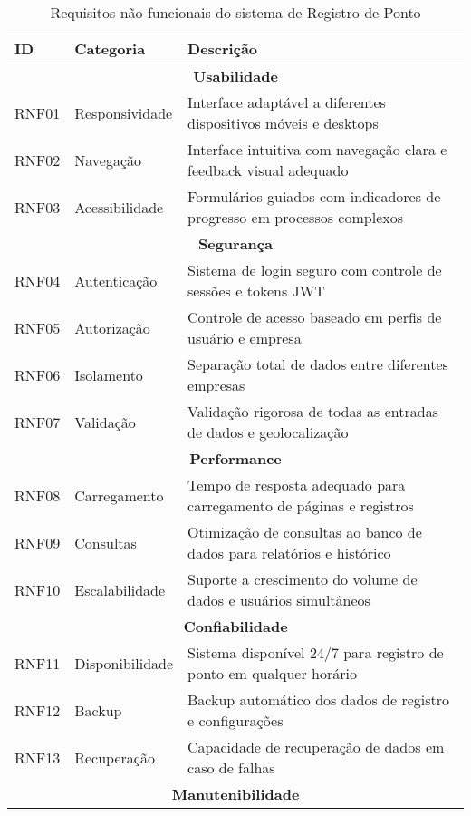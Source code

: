 \begin{table}[!htbp]
\centering
\small
\caption{Requisitos não funcionais do sistema de Registro de Ponto}
\label{tab:requisitos-nao-funcionais}
\begin{tabular}{|p{}|p{}|p{}|}
\hline
\textbf{ID} & \textbf{Categoria} & \textbf{Descrição} \\
\hline
\multicolumn{3}{|c|}{\textbf{Usabilidade}} \\
\hline
RNF01 & Responsividade & Interface adaptável a diferentes dispositivos móveis e desktops \\
\hline
RNF02 & Navegação & Interface intuitiva com navegação clara e feedback visual adequado \\
\hline
RNF03 & Acessibilidade & Formulários guiados com indicadores de progresso em processos complexos \\
\hline
\multicolumn{3}{|c|}{\textbf{Segurança}} \\
\hline
RNF04 & Autenticação & Sistema de login seguro com controle de sessões e tokens JWT \\
\hline
RNF05 & Autorização & Controle de acesso baseado em perfis de usuário e empresa \\
\hline
RNF06 & Isolamento & Separação total de dados entre diferentes empresas \\
\hline
RNF07 & Validação & Validação rigorosa de todas as entradas de dados e geolocalização \\
\hline
\multicolumn{3}{|c|}{\textbf{Performance}} \\
\hline
RNF08 & Carregamento & Tempo de resposta adequado para carregamento de páginas e registros \\
\hline
RNF09 & Consultas & Otimização de consultas ao banco de dados para relatórios e histórico \\
\hline
RNF10 & Escalabilidade & Suporte a crescimento do volume de dados e usuários simultâneos \\
\hline
\multicolumn{3}{|c|}{\textbf{Confiabilidade}} \\
\hline
RNF11 & Disponibilidade & Sistema disponível 24/7 para registro de ponto em qualquer horário \\
\hline
RNF12 & Backup & Backup automático dos dados de registro e configurações \\
\hline
RNF13 & Recuperação & Capacidade de recuperação de dados em caso de falhas \\
\hline
\multicolumn{3}{|c|}{\textbf{Manutenibilidade}} \\

\end{tabular}
\end{table}
